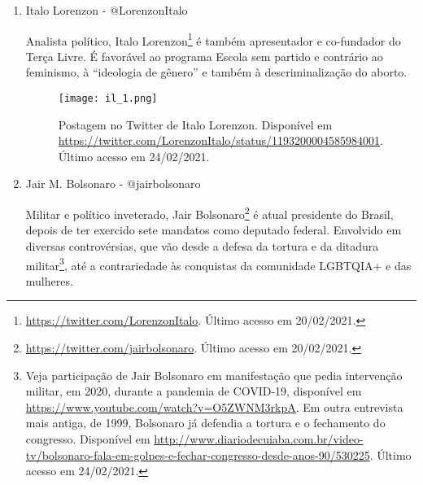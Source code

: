 \documentclass[
	12pt,				%
	openright,			%
	twoside,			%
	a4paper,			%
	english,			%
	brazil				%
	]{abntex2}
\begin{document}
\begin{anexosenv}
\begin{enumerate}
 \begin{figure}[!htbp]
    \centering
    \texttt{[image: hel\_1.png]}
    \caption{Postagem no Twitter de Helio Lopes. Disponível em \url{https://twitter.com/depheliolopes/status/1323356376169631744}. Último acesso em 24/02/2021.}
 \end{figure}
  
 \item Italo Lorenzon - @LorenzonItalo
 
 Analista político, Italo Lorenzon\footnote{\url{https://twitter.com/LorenzonItalo}. Último acesso em 20/02/2021.} é também apresentador e co-fundador do Terça Livre. É favorável ao programa Escola sem partido e contrário ao feminismo, à ``ideologia de gênero'' e também à descriminalização do aborto.
 
 \begin{figure}[!htbp]
    \centering
    \texttt{[image: il\_1.png]}
    \caption{Postagem no Twitter de Italo Lorenzon. Disponível em \url{https://twitter.com/LorenzonItalo/status/1193200004585984001}. Último acesso em 24/02/2021.}
 \end{figure}
  
 \item Jair M. Bolsonaro - @jairbolsonaro\label{jbols}
 
 Militar e político inveterado, Jair Bolsonaro\footnote{\url{https://twitter.com/jairbolsonaro}. Último acesso em 20/02/2021.} é atual presidente do Brasil, depois de ter exercido sete mandatos como deputado federal. Envolvido em diversas controvérsias, que vão desde a defesa da tortura e da ditadura militar\footnote{Veja participação de Jair Bolsonaro em manifestação que pedia intervenção militar, em 2020, durante a pandemia de COVID-19, disponível em \url{https://www.youtube.com/watch?v=O5ZWNM3rkpA}. Em outra entrevista mais antiga, de 1999, Bolsonaro já defendia a tortura e o fechamento do congresso. Disponível em \url{http://www.diariodecuiaba.com.br/video-tv/bolsonaro-fala-em-golpes-e-fechar-congresso-desde-anos-90/530225}. Último acesso em 24/02/2021.}, até a contrariedade às conquistas da comunidade LGBTQIA+ e das mulheres. 
 

\end{enumerate}
\end{anexosenv}
\end{document}
